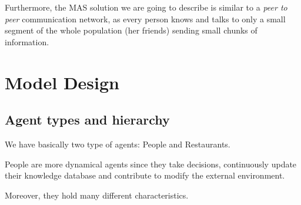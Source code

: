 \documentclass[10pt,a4paper,usenatbib]{article}
\begin{document}
Furthermore, the MAS solution we are going to describe is similar to a \textit{peer to peer} communication network, as every person knows and talks to only a small segment of the whole population (her friends) sending small chunks of information.

\section{Model Design}


\subsection{Agent types and hierarchy}

We have basically two type of agents: People and Restaurants.

People are more dynamical agents since they take decisions, continuously
update their knowledge database and contribute to modify the external
environment.

Moreover, they hold many different characteristics.
\end{document}
